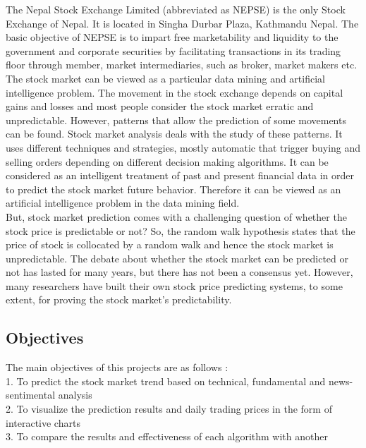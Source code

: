 The Nepal Stock Exchange Limited (abbreviated as NEPSE) is the only Stock Exchange of Nepal. It is located in Singha Durbar Plaza, Kathmandu Nepal. The basic objective of NEPSE is to impart free marketability and liquidity to the government and corporate securities by facilitating transactions in its trading floor through member, market intermediaries, such as broker, market makers etc.\\

The stock market can be viewed as a particular data mining and artificial intelligence problem. The movement in the stock exchange depends on capital gains and losses and most people consider the stock market erratic and unpredictable. However, patterns that allow the prediction of some movements can be found. Stock market analysis deals with the study of these patterns. It uses different techniques and strategies, mostly automatic that trigger buying and selling orders depending on different decision making algorithms. It can be considered as an intelligent treatment of past and present financial data in order to predict the stock market future behavior. Therefore it can be viewed as an artificial intelligence problem in the data mining field.\\

But, stock market prediction comes with a challenging question of whether the stock price is predictable or not? So, the random walk hypothesis states that the price of stock is collocated by a random walk and hence the stock market is unpredictable. The debate about whether the stock market can be predicted or not has lasted for many years, but there has not been a consensus yet. However, many researchers have built their own stock price predicting systems, to some extent, for proving the stock market's predictability.\\

\subsection{Objectives}
The main objectives of this projects are as follows :\\
 1. To predict the stock market trend based on technical, fundamental and news-sentimental analysis\\
2. To visualize the prediction results and daily trading prices in the form of interactive charts\\
3. To compare the results and effectiveness of each algorithm with another\\

